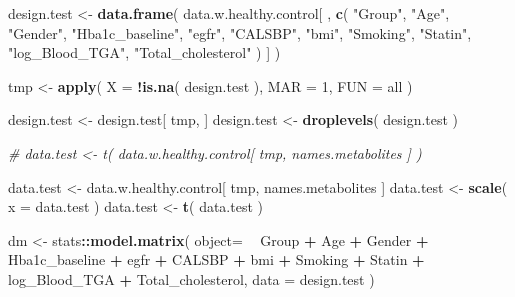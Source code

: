 \documentclass[]{article}
\newenvironment{Shaded}{\begin{snugshade}}{\end{snugshade}}
\newcommand{\CommentTok}[1]{\textcolor[rgb]{0.56,0.35,0.01}{\textit{#1}}}
\newcommand{\DataTypeTok}[1]{\textcolor[rgb]{0.13,0.29,0.53}{#1}}
\newcommand{\DecValTok}[1]{\textcolor[rgb]{0.00,0.00,0.81}{#1}}
\newcommand{\KeywordTok}[1]{\textcolor[rgb]{0.13,0.29,0.53}{\textbf{#1}}}
\newcommand{\NormalTok}[1]{#1}
\newcommand{\OperatorTok}[1]{\textcolor[rgb]{0.81,0.36,0.00}{\textbf{#1}}}
\newcommand{\StringTok}[1]{\textcolor[rgb]{0.31,0.60,0.02}{#1}}
\begin{document}
\begin{Shaded}
\begin{Highlighting}[]
\NormalTok{design.test <-}\StringTok{ }
\StringTok{  }\KeywordTok{data.frame}\NormalTok{( }
\NormalTok{    data.w.healthy.control[ , }
                            \KeywordTok{c}\NormalTok{( }
                              \StringTok{"Group"}\NormalTok{,}
                              \StringTok{"Age"}\NormalTok{,}
                              \StringTok{"Gender"}\NormalTok{, }
                              \StringTok{"Hba1c_baseline"}\NormalTok{,}
                              \StringTok{"egfr"}\NormalTok{,}
                              \StringTok{"CALSBP"}\NormalTok{,}
                              \StringTok{"bmi"}\NormalTok{,}
                              \StringTok{"Smoking"}\NormalTok{,}
                              \StringTok{"Statin"}\NormalTok{,}
                              \StringTok{"log_Blood_TGA"}\NormalTok{,}
                              \StringTok{"Total_cholesterol"}
\NormalTok{                              )}
\NormalTok{                            ]}
\NormalTok{    )}

\NormalTok{tmp <-}\StringTok{ }
\StringTok{  }\KeywordTok{apply}\NormalTok{(}
    \DataTypeTok{X =} \OperatorTok{!}\KeywordTok{is.na}\NormalTok{( design.test ),}
    \DataTypeTok{MAR =} \DecValTok{1}\NormalTok{,}
    \DataTypeTok{FUN =}\NormalTok{ all}
\NormalTok{  )}

\NormalTok{design.test <-}\StringTok{ }\NormalTok{design.test[ tmp, ]}
\NormalTok{design.test <-}\StringTok{ }\KeywordTok{droplevels}\NormalTok{( design.test )}

\CommentTok{# data.test <- t( data.w.healthy.control[ tmp, names.metabolites ] )}

\NormalTok{data.test <-}\StringTok{ }\NormalTok{data.w.healthy.control[ tmp, names.metabolites ]}
\NormalTok{data.test <-}\StringTok{ }\KeywordTok{scale}\NormalTok{( }\DataTypeTok{x =}\NormalTok{ data.test )}
\NormalTok{data.test <-}\StringTok{ }\KeywordTok{t}\NormalTok{( data.test )}

\NormalTok{dm <-}\StringTok{ }
\StringTok{  }\NormalTok{stats}\OperatorTok{::}\KeywordTok{model.matrix}\NormalTok{( }
    \DataTypeTok{object=} 
      \OperatorTok{~}\StringTok{ }\NormalTok{Group }\OperatorTok{+}\StringTok{ }
\StringTok{      }\NormalTok{Age }\OperatorTok{+}\StringTok{ }
\StringTok{      }\NormalTok{Gender }\OperatorTok{+}
\StringTok{      }\NormalTok{Hba1c_baseline }\OperatorTok{+}\StringTok{ }
\StringTok{      }\NormalTok{egfr }\OperatorTok{+}\StringTok{ }
\StringTok{      }\NormalTok{CALSBP }\OperatorTok{+}\StringTok{ }
\StringTok{      }\NormalTok{bmi }\OperatorTok{+}\StringTok{ }
\StringTok{      }\NormalTok{Smoking }\OperatorTok{+}
\StringTok{      }\NormalTok{Statin }\OperatorTok{+}
\StringTok{      }\NormalTok{log_Blood_TGA }\OperatorTok{+}\StringTok{ }
\StringTok{      }\NormalTok{Total_cholesterol,}
    \DataTypeTok{data =}\NormalTok{ design.test )}


\end{Highlighting}
\end{Shaded}
\end{document}
